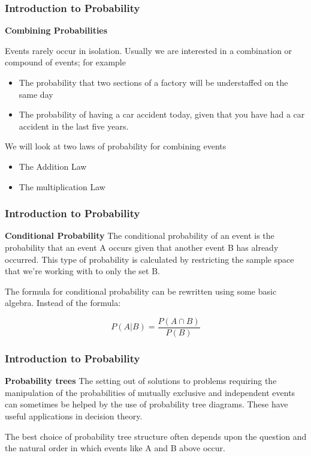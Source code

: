 \documentclass[IntroMain.tex]{subfiles}
\begin{document}
\begin{frame}
	\frametitle{Introduction to Probability}
	\Large
	\textbf{Combining Probabilities}
	
	Events rarely occur in isolation. Usually we are interested in a combination or compound of events; for example
	\begin{itemize}
		\item The probability that two sections of a factory will be understaffed on the same day 
		\item The probability of having a car accident today, given that you have had a car accident in the last five years.
	\end{itemize}	
	
	We will look at two laws of probability for combining events
	\begin{itemize}
		\item The Addition Law 
		\item The multiplication Law
	\end{itemize}	
	
\end{frame}
\begin{frame}
	\frametitle{Introduction to Probability}
	\Large
	\textbf{Conditional Probability}
	The conditional probability of an event is the probability that an event A occurs given that another event B has already occurred. This type of probability is calculated by restricting the sample space that we’re working with to only the set B.
	
	The formula for conditional probability can be rewritten using some basic algebra. Instead of the formula:
	
	\[P(A | B) = \frac{P(A \cap B) }{P( B )}  \]
	
\end{frame}
\begin{frame}
	\frametitle{Introduction to Probability}
	\Large
	\textbf{Probability trees}
	The setting out of solutions to problems requiring the manipulation of the probabilities of mutually exclusive and independent events can sometimes be helped by the use of probability tree diagrams. These have useful applications in decision theory.
	
	The best choice of probability tree structure often depends upon the question and the natural order in which events like A and B above occur.
	
\end{frame}
\end{document}
